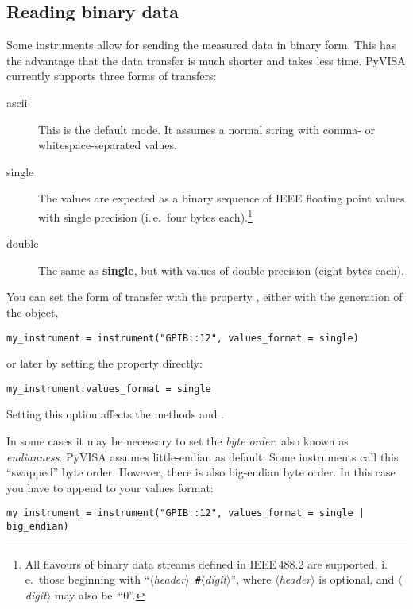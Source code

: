 \documentclass{howto}
\begin{document}
\subsection{Reading binary data}
\label{sec:reading-binary-data}

Some instruments allow for sending the measured data in binary form.  This has
the advantage that the data transfer is much shorter and takes less time.
PyVISA currently supports three forms of transfers:

\begin{description}
\item[ascii] This is the default mode.  It assumes a normal string with comma-
  or whitespace-separated values.
\item[single] The values are expected as a binary sequence of IEEE floating
  point values with single precision (i.\,e.\ four bytes each).\footnote{All
    flavours of binary data streams defined in IEEE\,488.2 are supported,
    i.\,e.\ those beginning with
    ``\textit{$\langle$header$\rangle$}~\texttt{\#}\textit{$\langle$digit$\rangle$}'',
    where \textit{$\langle$header$\rangle$} is optional, and
    \textit{$\langle$digit$\rangle$} may also be~``0''.}
\item[double] The same as \textbf{single}, but with values of double precision
  (eight bytes each).
\end{description}

You can set the form of transfer with the property , either
with the generation of the object,
\begin{verbatim}
my_instrument = instrument("GPIB::12", values_format = single)
\end{verbatim}
or later by setting the property directly:
\begin{verbatim}
my_instrument.values_format = single
\end{verbatim}
Setting this option affects the methods  and
.

In some cases it may be necessary to set the \emph{byte order}, also known as
\emph{endianness}.  PyVISA assumes little-endian as default.  Some instruments
call this ``swapped'' byte order.  However, there is also big-endian byte
order.  In this case you have to append  to your values
format:
\begin{verbatim}
my_instrument = instrument("GPIB::12", values_format = single | big_endian)
\end{verbatim}
\end{document}
